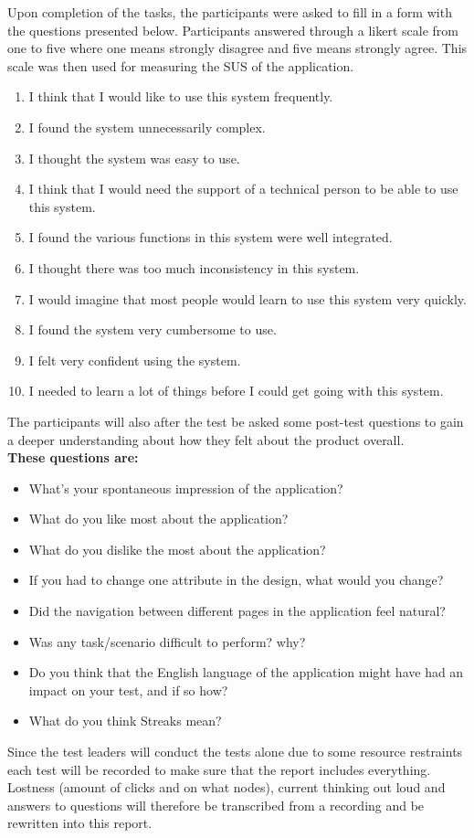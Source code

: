 \noindent Upon completion of the tasks, the participants were asked to fill in a form with the questions presented below. Participants answered through a likert scale from one to five where one means strongly disagree and five means strongly agree. This scale was then used for measuring the SUS of the application. \\ 
\begin{enumerate}
\item I think that I would like to use this system frequently. 
\item I found the system unnecessarily complex. 
\item I thought the system was easy to use. 
\item I think that I would need the support of a technical person to be able to use this system. 
\item I found the various functions in this system were well integrated. 
\item I thought there was too much inconsistency in this system. 
\item I would imagine that most people would learn to use this system very quickly. 
\item I found the system very cumbersome to use. 
\item I felt very confident using the system. 
\item I needed to learn a lot of things before I could get going with this system. \\ 
\end{enumerate}
The participants will also after the test be asked some post-test questions to gain a deeper understanding about how they felt about the product overall. \\ 

\noindent\textbf{These questions are:} 
\begin{itemize}
\item What's your spontaneous impression of the application?
\item What do you like most about the application?
\item What do you dislike the most about the application?
\item If you had to change one attribute in the design, what would you change?
\item Did the navigation between different pages in the application feel natural?
\item Was any task/scenario difficult to perform? why?
\item Do you think that the English language of the application might have had an impact on your test, and if so how? 
\item What do you think Streaks mean? \\
\end{itemize}
\noindent Since the test leaders will conduct the tests alone due to some resource restraints each test will be recorded to make sure that the report includes everything. Lostness (amount of clicks and on what nodes), current thinking out loud and answers to questions will therefore be transcribed from a recording and be rewritten into this report. 






